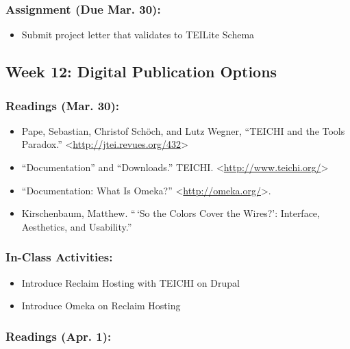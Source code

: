 \documentclass[]{article}
\begin{document}
\subsubsection{Assignment (Due Mar. 30):}\label{assignment-due-mar.-30}

\begin{itemize}
\itemsep1pt\parskip0pt
\item
  Submit project letter that validates to TEILite Schema
\end{itemize}

\subsection{Week 12: Digital Publication
Options}\label{week-12-digital-publication-options}

\subsubsection{Readings (Mar. 30):}\label{readings-mar.-30}

\begin{itemize}
\itemsep1pt\parskip0pt
\item
  Pape, Sebastian, Christof Schöch, and Lutz Wegner, ``TEICHI and the
  Tools Paradox.''
  \textless{}\url{http://jtei.revues.org/432}\textgreater{}
\item
  ``Documentation'' and ``Downloads.'' TEICHI.
  \textless{}\url{http://www.teichi.org/}\textgreater{}
\item
  ``Documentation: What Is Omeka?''
  \textless{}\url{http://omeka.org/}\textgreater{}.
\item
  Kirschenbaum, Matthew. ``\,`So the Colors Cover the Wires?':
  Interface, Aesthetics, and Usability.''
\end{itemize}

\subsubsection{In-Class Activities:}\label{in-class-activities-2}

\begin{itemize}
\itemsep1pt\parskip0pt
\item
  Introduce Reclaim Hosting with TEICHI on Drupal
\item
  Introduce Omeka on Reclaim Hosting
\end{itemize}

\subsubsection{Readings (Apr. 1):}\label{readings-apr.-1}
\end{document}
